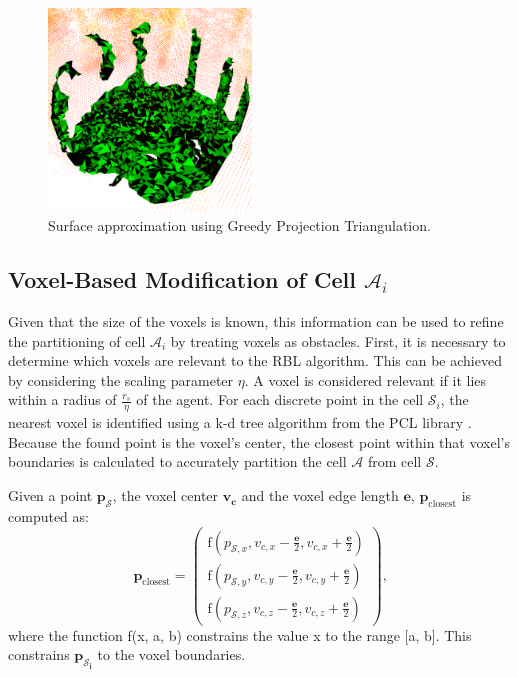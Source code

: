             \begin{figure}[htbp]
                \centering
                \includegraphics[width=0.48\textwidth]{./fig/rviz/triangulation_surface_aprox.png}
                \caption{
                    Surface approximation using Greedy Projection Triangulation.
                }
                \label{fig:triangulation}
            \end{figure}

        \subsection{Voxel-Based Modification of Cell $\mathcal{A}_i$}
            Given that the size of the voxels is known, this information can be used to refine the partitioning of cell $\mathcal{A}_i$ by treating voxels as obstacles.
            First, it is necessary to determine which voxels are relevant to the \ac{RBL} algorithm.
            This can be achieved by considering the scaling parameter $\eta$.
            A voxel is considered relevant if it lies within a radius of $\frac{r_s}{\eta}$ of the agent.
            For each discrete point in the cell $\mathcal{S}_i$, the nearest voxel is identified using a k-d tree algorithm from the \ac{PCL} library \cite{kd_tree}.
            Because the found point is the voxel's center, the closest point within that voxel's boundaries is calculated to accurately partition the cell $\mathcal{A}$ from cell $\mathcal{S}$.

            Given a point $\mathbf{p_{\mathcal{S}}}$, the voxel center $\mathbf{v_c}$ and the voxel edge length $\mathbf{e}$, $\mathbf{p}_{\text{closest}}$ is computed as: 
            \begin{equation}
                \mathbf{p}_{\text{closest}} =
                \begin{pmatrix}
                    \text{f}(p_{\mathcal{S},x}, v_{c,x} - \frac{\mathbf{e}}{2}, v_{c,x} + \frac{\mathbf{e}}{2}) \\
                    \text{f}(p_{\mathcal{S},y}, v_{c,y} - \frac{\mathbf{e}}{2}, v_{c,y} + \frac{\mathbf{e}}{2}) \\
                    \text{f}(p_{\mathcal{S},z}, v_{c,z} - \frac{\mathbf{e}}{2}, v_{c,z} + \frac{\mathbf{e}}{2})
                \end{pmatrix}\text{,}
            \end{equation}
            where the function f(x, a, b) constrains the value x to the range [a, b].
            This constrains $\mathbf{p_{\mathcal{S}_i}}$ to the voxel boundaries.
            

